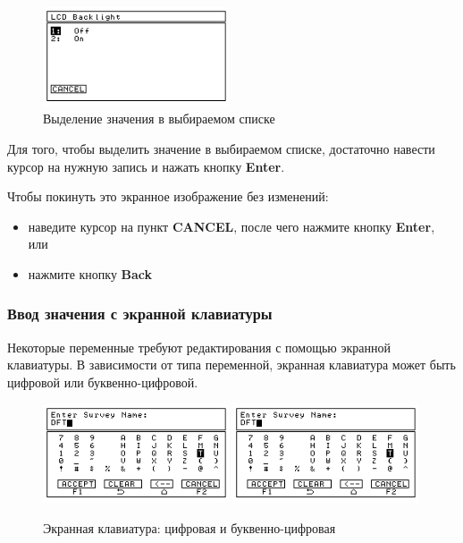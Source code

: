 \begin{figure}[h]
  \centering
  \includegraphics[width=0.49\textwidth]{figures/choosing_a_value_from_a_selectable_list}
  \caption{Выделение значения в выбираемом списке}
  \label{fig:choosing_a_value_from_a_selectable_list}
\end{figure}

Для того, чтобы выделить значение в выбираемом списке, достаточно навести курсор
на нужную запись и нажать кнопку \textbf{Enter}.

Чтобы покинуть это экранное изображение без изменений:
\begin{itemize}
  \item наведите курсор на пункт \textbf{CANCEL}, после чего нажмите кнопку
    \textbf{Enter}, или
  \item нажмите кнопку \textbf{Back}
\end{itemize}

\subsubsection{Ввод значения с экранной клавиатуры}
\label{subsubsec:entering_a_value_with_onscreen_keypad}

Некоторые переменные требуют редактирования с помощью экранной клавиатуры.  В
зависимости от типа переменной, экранная клавиатура может быть цифровой или
буквенно-цифровой.

\begin{figure}[h]
  \centering
  \includegraphics[width=0.49\textwidth]{figures/onscreen_keypad_numeric_and_alphanumeric_1}
  \includegraphics[width=0.49\textwidth]{figures/onscreen_keypad_numeric_and_alphanumeric_2}
  \caption{Экранная клавиатура: цифровая и буквенно-цифровая}
  \label{fig:onscreen_keypad_numeric_and_alphanumeric}
\end{figure}


